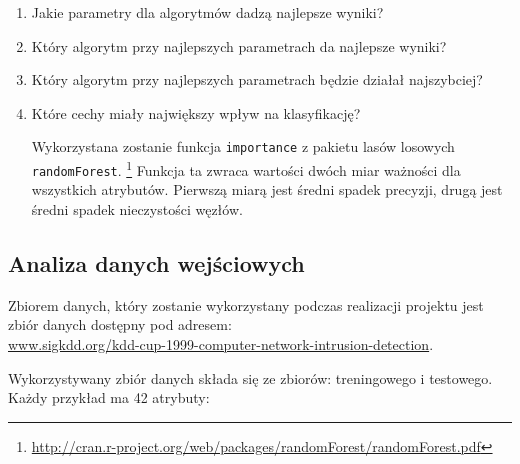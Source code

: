 \documentclass[a4paper, 12pt]{article}
\begin{document}
\begin{enumerate}
 \item Jakie parametry dla algorytmów dadzą najlepsze wyniki?
 \item Który algorytm przy najlepszych parametrach da najlepsze wyniki?
 \item Który algorytm przy najlepszych parametrach będzie działał najszybciej?
 \item Które cechy miały największy wpływ na klasyfikację?

Wykorzystana zostanie funkcja \texttt{importance} z pakietu lasów losowych \texttt{randomForest}.
\footnote{\url{http://cran.r-project.org/web/packages/randomForest/randomForest.pdf}}
Funkcja ta zwraca wartości dwóch miar ważności dla wszystkich atrybutów.
Pierwszą miarą jest średni spadek precyzji, drugą jest średni spadek nieczystości węzłów.
\end{enumerate}

\subsection{Analiza danych wejściowych}

Zbiorem danych, który zostanie wykorzystany podczas realizacji projektu jest zbiór danych dostępny 
pod adresem: \\
\url{www.sigkdd.org/kdd-cup-1999-computer-network-intrusion-detection}.

Wykorzystywany zbiór danych składa się ze zbiorów: treningowego i testowego.
Każdy przykład ma 42 atrybuty: \\
\end{document}
